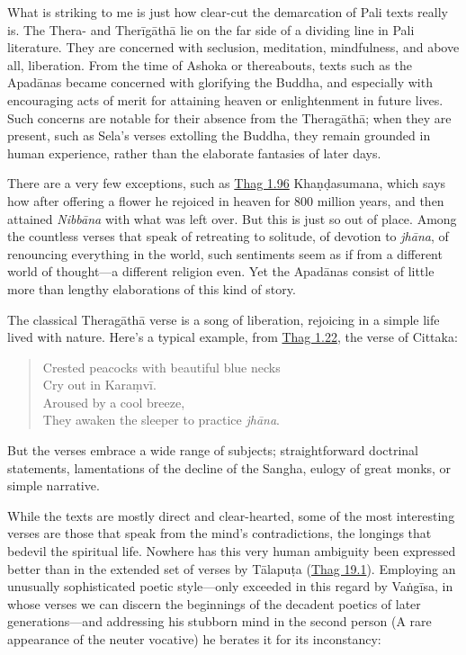 \documentclass[12pt,openany]{book}%
\begin{document}
What is striking to me is just how clear-cut the demarcation of Pali texts really is. The Thera- and \textsanskrit{Therīgāthā} lie on the far side of a dividing line in Pali literature. They are concerned with seclusion, meditation, mindfulness, and above all, liberation. From the time of Ashoka or thereabouts, texts such as the \textsanskrit{Apadānas} became concerned with glorifying the Buddha, and especially with encouraging acts of merit for attaining heaven or enlightenment in future lives. Such concerns are notable for their absence from the \textsanskrit{Theragāthā}; when they are present, such as Sela’s verses extolling the Buddha, they remain grounded in human experience, rather than the elaborate fantasies of later days.

There are a very few exceptions, such as \href{https://suttacentral.net/thag1.96}{Thag 1.96} \textsanskrit{Khaṇḍasumana}, which says how after offering a flower he rejoiced in heaven for 800 million years, and then attained \textit{\textsanskrit{Nibbāna}} with what was left over. But this is just so out of place. Among the countless verses that speak of retreating to solitude, of devotion to \textit{\textsanskrit{jhāna}}, of renouncing everything in the world, such sentiments seem as if from a different world of thought—a different religion even. Yet the \textsanskrit{Apadānas} consist of little more than lengthy elaborations of this kind of story.

The classical \textsanskrit{Theragāthā} verse is a song of liberation, rejoicing in a simple life lived with nature. Here’s a typical example, from \href{https://suttacentral.net/thag1.22}{Thag 1.22}, the verse of Cittaka:

\begin{quotation}%
Crested peacocks with beautiful blue necks \\
Cry out in \textsanskrit{Karaṃvī}. \\
Aroused by a cool breeze, \\
They awaken the sleeper to practice \textit{\textsanskrit{jhāna}}.

%
\end{quotation}

But the verses embrace a wide range of subjects; straightforward doctrinal statements, lamentations of the decline of the Sangha, eulogy of great monks, or simple narrative.

While the texts are mostly direct and clear-hearted, some of the most interesting verses are those that speak from the mind’s contradictions, the longings that bedevil the spiritual life. Nowhere has this very human ambiguity been expressed better than in the extended set of verses by \textsanskrit{Tālapuṭa} (\href{https://suttacentral.net/thag19.1}{Thag 19.1}). Employing an unusually sophisticated poetic style—only exceeded in this regard by \textsanskrit{Vaṅgīsa}, in whose verses we can discern the beginnings of the decadent poetics of later generations—and addressing his stubborn mind in the second person (A rare appearance of the neuter vocative) he berates it for its inconstancy:
\end{document}
